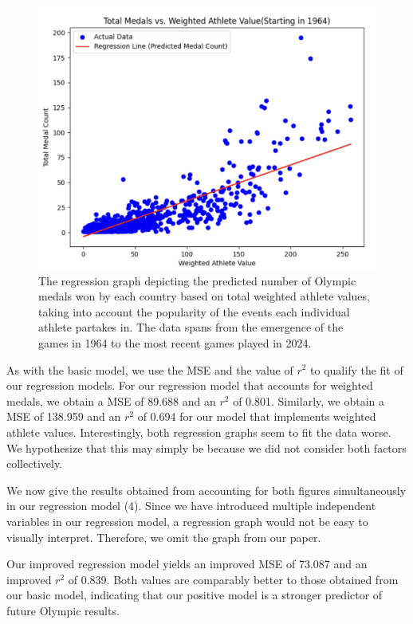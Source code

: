 \documentclass{mcmthesis}
\begin{document}
\begin{figure}
     \centering
     \includegraphics[width=\textwidth]{figures/Regression_Graph_Four.png}
     \caption{The regression graph depicting the predicted number of Olympic medals won by each country based on total weighted athlete values, taking into account the popularity of the events each individual athlete partakes in. The data spans from the emergence of the games in 1964 to the most recent games played in 2024.}
     \label{fig: image 4}
\end{figure} \par
As with the basic model, we use the MSE and the value of $r^2$ to qualify the fit of our regression models. For our regression model that accounts for weighted medals, we obtain a MSE of 89.688 and an $r^2$ of 0.801. Similarly, we obtain a MSE of 138.959 and an $r^2$ of 0.694 for our model that implements weighted athlete values. Interestingly, both regression graphs seem to fit the data worse. We hypothesize that this may simply be because we did not consider both factors collectively. \par
We now give the results obtained from accounting for both figures simultaneously in our regression model (4). Since we have introduced multiple independent variables in our regression model, a regression graph would not be easy to visually interpret. Therefore, we omit the graph from our paper. \par
Our improved regression model yields an improved MSE of 73.087 and an improved $r^2$ of 0.839. Both values are comparably better to those obtained from our basic model, indicating that our positive model is a stronger predictor of future Olympic results. 
\end{document}
